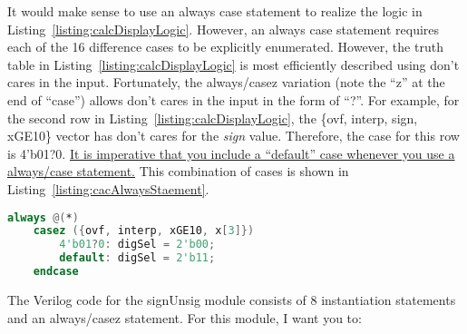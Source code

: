 It would make sense to use an always case statement to realize the logic
in Listing~\ref{listing:calcDisplayLogic}. However, an always case statement requires each of the 16
difference cases to be explicitly enumerated. However, the truth table
in Listing~\ref{listing:calcDisplayLogic} is most efficiently described using don't cares in the
input. Fortunately, the always/casez variation (note the ``z'' at the
end of ``case'') allows don't cares in the input in the form of ``?''.
For example, for the second row in Listing~\ref{listing:calcDisplayLogic}, the \{ovf, interp, sign,
xGE10\} vector has don't cares for the \emph{sign} value. Therefore, the
case for this row is 4'b01?0. \uline{It is imperative that you include a
``default'' case whenever you use a always/case statement.} This
combination of cases is shown in Listing~\ref{listing:cacAlwaysStaement}.


\begin{lstlisting}[language=Verilog,
 caption={The always/casez statement allows don't cares in the input.},
 label={listing:cacAlwaysStaement},
 frame=single]
 always @(*)
    casez ({ovf, interp, xGE10, x[3]})
        4'b01?0: digSel = 2'b00;
        default: digSel = 2'b11;
    endcase

 \end{lstlisting}


\protect\hypertarget{sigUnsign_Verilog}{}{}The Verilog code for the
signUnsig module consists of 8 instantiation statements and an
always/casez statement. For this module, I want you to:

